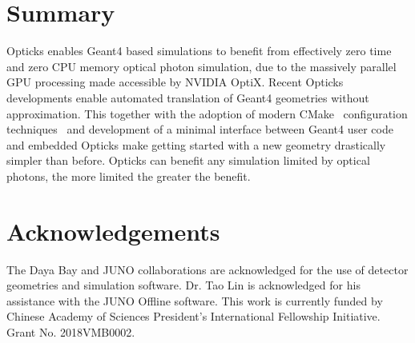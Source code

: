 \documentclass{webofc}
\begin{document}
\section{Summary}
%
Opticks enables Geant4 based simulations to benefit from effectively zero time 
and zero CPU memory optical photon simulation, due to the massively parallel GPU 
processing made accessible by NVIDIA OptiX.
Recent Opticks developments enable automated translation of Geant4 geometries without approximation. 
This together with the adoption of modern CMake~\cite{CMake} configuration techniques~\cite{BCM} and development of a 
minimal interface between Geant4 user code and embedded Opticks make getting started with a new geometry
drastically simpler than before.
Opticks can benefit any simulation limited by optical photons, the more limited the greater the 
benefit.
%
%
\section*{Acknowledgements}
%
The Daya Bay and JUNO collaborations are acknowledged for the use of detector 
geometries and simulation software. Dr. Tao Lin is acknowledged for his assistance with 
the JUNO Offline software. 
This work is currently funded by Chinese Academy of Sciences President’s International Fellowship Initiative. 
Grant No. 2018VMB0002.
%
%
%
\end{document}
